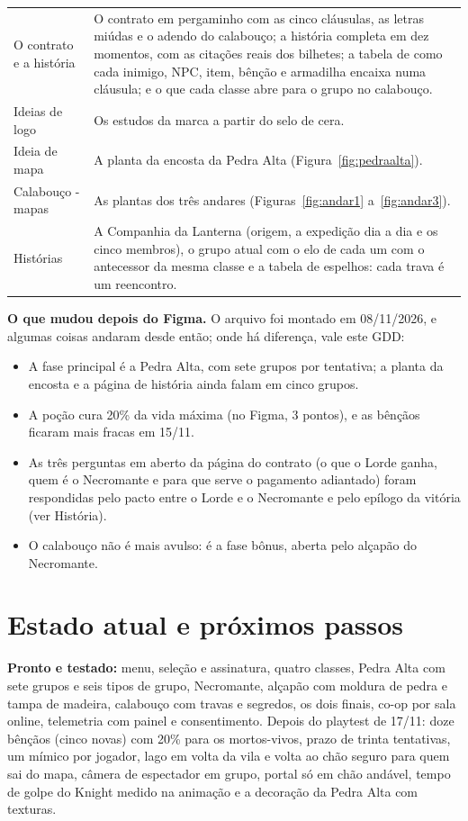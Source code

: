 \documentclass[11pt,a4paper]{article}
\begin{document}
\begin{xltabular}{\textwidth}{@{}lX@{}}
O contrato e a história & O contrato em pergaminho com as cinco cláusulas, as letras miúdas e o adendo do calabouço; a história completa em dez momentos, com as citações reais dos bilhetes; a tabela de como cada inimigo, NPC, item, bênção e armadilha encaixa numa cláusula; e o que cada classe abre para o grupo no calabouço. \\
Ideias de logo & Os estudos da marca a partir do selo de cera. \\
Ideia de mapa & A planta da encosta da Pedra Alta (Figura~\ref{fig:pedraalta}). \\
Calabouço - mapas & As plantas dos três andares (Figuras~\ref{fig:andar1} a~\ref{fig:andar3}). \\
Histórias & A Companhia da Lanterna (origem, a expedição dia a dia e os cinco membros), o grupo atual com o elo de cada um com o antecessor da mesma classe e a tabela de espelhos: cada trava é um reencontro. \\
\bottomrule
\end{xltabular}

\textbf{O que mudou depois do Figma.} O arquivo foi montado em 08/11/2026, e algumas coisas andaram desde então; onde há diferença, vale este GDD:
\begin{itemize}
    \item A fase principal é a Pedra Alta, com sete grupos por tentativa; a planta da encosta e a página de história ainda falam em cinco grupos.
    \item A poção cura 20\% da vida máxima (no Figma, 3 pontos), e as bênçãos ficaram mais fracas em 15/11.
    \item As três perguntas em aberto da página do contrato (o que o Lorde ganha, quem é o Necromante e para que serve o pagamento adiantado) foram respondidas pelo pacto entre o Lorde e o Necromante e pelo epílogo da vitória (ver História).
    \item O calabouço não é mais avulso: é a fase bônus, aberta pelo alçapão do Necromante.
\end{itemize}

\section{Estado atual e próximos passos}

\textbf{Pronto e testado:} menu, seleção e assinatura, quatro classes, Pedra Alta com sete grupos e seis tipos de grupo, Necromante, alçapão com moldura de pedra e tampa de madeira, calabouço com travas e segredos, os dois finais, co-op por sala online, telemetria com painel e consentimento. Depois do playtest de 17/11: doze bênçãos (cinco novas) com 20\% para os mortos-vivos, prazo de trinta tentativas, um mímico por jogador, lago em volta da vila e volta ao chão seguro para quem sai do mapa, câmera de espectador em grupo, portal só em chão andável, tempo de golpe do Knight medido na animação e a decoração da Pedra Alta com texturas.
\end{document}
